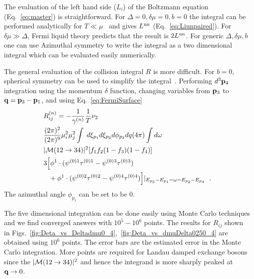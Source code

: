 \documentclass[10pt, aps, prd, superscriptaddress, nofootinbib, 
               amsmath, amssymb, twocolumn,
               preprintnumbers, showpacs,
               raggedbottom,
               floatfix]{revtex4-1}
\newcommand{\calM}{{\cal{M}}}
\newcommand{\bfp}{{\bf{p}}}
\newcommand{\bfq}{{\bf{q}}}
\newcommand{\un}{{\rm{un}}}
\begin{document}
The evaluation of the left hand side ($L_i$) of the Boltzmann equation
(Eq.~\ref{eq:master}) is straightforward. For $\Delta=0, \delta\mu=0, b=0$ the
integral can be performed analytically for
$T\ll\mu$~\cite{Heiselberg:1993,Alford:2014doa} and gives $L^\un$
(Eq.~\ref{eq:Liunpaired}). For $\delta\mu\gg\Delta$, Fermi liquid theory
predicts that the result is $2L^\un$. For generic $\Delta, \delta\mu, b$ one
can use Azimuthal symmetry to write the integral as a two dimensional integral
which can be evaluated easily numerically.

The general evaluation of the collision integral $R$ is more difficult. For $b=0$,
spherical symmetry can be used to simplify the
integral~\cite{Heiselberg:1993,Alford:2014doa}. Performing $d^3\bfp_4$ integration
using the momentum $\delta$ function, changing variables from $\bfp_3$ to
$\bfq=\bfp_3-\bfp_1$, and using Eq.~\ref{eq:FermiSurface}
\begin{equation}
\begin{split}
&R_{ij}^{(n)}=-\frac{1}{\gamma^{(n)}}\frac{1}{T} \nu_2\\ 
&\frac{(2\pi)^2}{(2\pi)^9}\mu_i^2\mu_j^2 \int\;
d\xi_{p_1} d\xi_{p_2} d\phi_{p_2} dq (4\pi) 
\int d\omega\\
&
|\calM(12\rightarrow34)|^2
[f_1f_2(1-f_3)(1-f_4)]\\
&
3\Bigl[\phi^{1}\cdot(\psi^{(0)1}\tau^{(0)1}-\psi^{(0)3}\tau^{(0)3}) \\
 &
 \phantom{+}+
 \phi^{1}\cdot(\psi^{(0)2}\tau^{(0)2}-\psi^{(0)4}\tau^{(0)4})
 \Bigr]|_{E_{p_3}-E_{p_1}=\omega=E_{p_2}-E_{p_4}}~\label{eq:RSphericalSimplified}\;.
\end{split}
\end{equation}
The azimuthal angle $\phi_{p_1}$ can be set to be $0$.

The five dimensional integration can be done easily using Monte Carlo techniques and
we find converged answers with $10^5-10^6$ points. The results for $R_{ij}$ shown in
Figs.~\ref{fig:Deta_vs_Deltadmu0_4},~\ref{fig:Deta_vs_dmuDelta0250_4} are
obtained using $10^6$ points. The error bars are the estimated error
in the Monte Carlo integration. More points are required for
Landau damped exchange bosons since the $|\calM(12\rightarrow34)|^2$ and hence
the integrand is more sharply peaked at $\bfq\rightarrow 0$.
\end{document}
